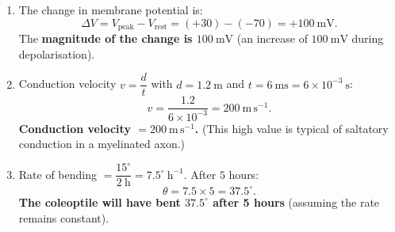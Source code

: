 \documentclass[11pt]{article}
\begin{document}
\begin{corrige}
\begin{enumerate}
\item The change in membrane potential is:
\[
\Delta V = V_{\text{peak}} - V_{\text{rest}} = (+30) - (-70) = +100\ \mathrm{mV}.
\]
The \textbf{magnitude of the change is $100\ \mathrm{mV}$} (an increase of $100\ \mathrm{mV}$ during depolarisation).

\item Conduction velocity $v = \dfrac{d}{t}$ with $d = 1.2\ \mathrm{m}$ and $t = 6\ \mathrm{ms} = 6 \times 10^{-3}\ \mathrm{s}$:
\[
v = \frac{1.2}{6 \times 10^{-3}} = 200\ \mathrm{m\,s^{-1}}.
\]
\textbf{Conduction velocity $= 200\ \mathrm{m\,s^{-1}}$.} (This high value is typical of saltatory conduction in a myelinated axon.)

\item Rate of bending $= \dfrac{15^\circ}{2\ \mathrm{h}} = 7.5^\circ\ \mathrm{h^{-1}}$. After $5$ hours:
\[
\theta = 7.5 \times 5 = 37.5^\circ.
\]
\textbf{The coleoptile will have bent $37.5^\circ$ after 5 hours} (assuming the rate remains constant).
\end{enumerate}
\end{corrige}
\end{document}
